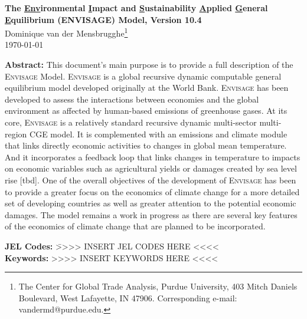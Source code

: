 \documentclass[11pt,letterpaper]{report}
\begin{document}
\pagestyle{empty}

\vspace*{1cm}

\begin{center}

\Large \textbf{{The \underline{Env}ironmental \underline{I}mpact and
   \underline{S}ustainability \underline{A}pplied \underline{G}eneral
   \underline{E}quilibrium ({ENVISAGE}) Model, Version 10.4}} \\[2cm]

\large{Dominique van der Mensbrugghe\footnote{The Center for Global Trade Analysis,
   Purdue University, 403 Mitch Daniels Boulevard, West Lafayette, IN 47906.
   Corresponding e-mail: vandermd@purdue.edu.}
} \\ [1cm]

\today \\ [2cm]

\normalsize
\begin{minipage}{0.85\linewidth}
\textbf{Abstract: }
{This document's main purpose is to provide a full description
of the \textsc{Envisage} Model. \textsc{Envisage} is a global recursive dynamic
computable general equilibrium model developed originally at the {World Bank}.
\textsc{Envisage} has been developed to
assess the interactions between economies and the global environment as affected
by human-based emissions of greenhouse gases. At its core, \textsc{Envisage} is
a relatively standard recursive dynamic multi-sector multi-region CGE model. It
is complemented with an emissions and climate module that links
directly economic activities to changes in global mean temperature. And it
incorporates a feedback loop that links changes in temperature to impacts on
economic variables such as agricultural yields or damages created by sea level
rise [tbd]. One of the overall objectives of the development of
\textsc{Envisage} has been to provide a greater focus on the economics of
climate change for a more detailed set of developing countries as well as
greater attention to the potential economic damages. The model remains a work in
progress as there are several key features of the economics of climate change
that are planned to be incorporated.}
\end{minipage}
\end{center}

\vspace{2cm}
\begin{tabbing}
\hspace*{0.5cm} \textbf{JEL Codes:} \= {>>>> INSERT JEL CODES HERE <<<<} \\
\hspace*{0.5cm} \textbf{Keywords:}  \> {>>>> INSERT KEYWORDS HERE <<<<}\\
\end{tabbing}
\newpage
\end{document}
